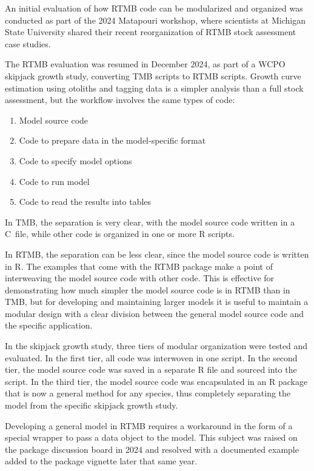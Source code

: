\documentclass{SCreport}
\newcommand\cpp{\mbox{C\raisebox{0.5ex}{\tiny\bfseries ++}}}
\begin{document}
An initial evaluation of how RTMB code can be modularized and organized was
conducted as part of the 2024 Matapouri workshop, where scientists at Michigan
State University shared their recent reorganization of RTMB stock assessment
case studies.

The RTMB evaluation was resumed in December 2024, as part of a WCPO skipjack
growth study, converting TMB scripts to RTMB scripts. Growth curve estimation
using otoliths and tagging data is a simpler analysis than a full stock
assessment, but the workflow involves the same types of code:

\begin{enumerate}
  \item Model source code\\[-4.5ex]
  \item Code to prepare data in the model-specific format\\[-4.5ex]
  \item Code to specify model options\\[-4.5ex]
  \item Code to run model\\[-4.5ex]
  \item Code to read the results into tables
\end{enumerate}

In TMB, the separation is very clear, with the model source code written in a
\cpp\ file, while other code is organized in one or more R scripts.

In RTMB, the separation can be less clear, since the model source code is
written in R. The examples that come with the RTMB package make a point of
interweaving the model source code with other code. This is effective for
demonstrating how much simpler the model source code is in RTMB than in TMB, but
for developing and maintaining larger models it is useful to maintain a modular
design with a clear division between the general model source code and the
specific application.

In the skipjack growth study, three tiers of modular organization were tested
and evaluated. In the first tier, all code was interwoven in one script. In the
second tier, the model source code was saved in a separate R file and sourced
into the script. In the third tier, the model source code was encapsulated in an
R package that is now a general method for any species, thus completely
separating the model from the specific skipjack growth study.

Developing a general model in RTMB requires a workaround in the form of a
special wrapper to pass a data object to the model. This subject was raised on
the package discussion board in 2024 and resolved with a documented example
added to the package vignette later that same year.
\end{document}
